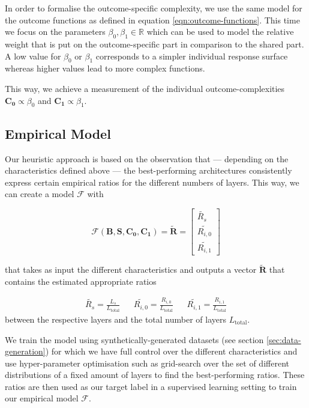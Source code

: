 In order to formalise the outcome-specific complexity, we use the same model for the outcome functions as defined in equation \ref{eqn:outcome-functions}. This time we focus on the parameters $\beta_0, \beta_1 \in \mathbb{R}$ which can be used to model the relative weight that is put on the outcome-specific part in comparison to the shared part. A low value for $\beta_0$ or $\beta_1$ corresponds to a simpler individual response surface whereas higher values lead to more complex functions.  

This way, we achieve a measurement of the individual outcome-complexities $\mathbf{C_0} \propto \beta_0$ and $\mathbf{C_1} \propto \beta_1$.

\subsection{Empirical Model} \label{sec:empirical-model}
Our heuristic approach is based on the observation that --- depending on the characteristics defined above --- the best-performing architectures consistently express certain empirical ratios for the different numbers of layers. This way, we can create a model $\mathcal{F}$ with 

\begin{equation}
\mathcal{F}(\mathbf{B}, \mathbf{S}, \mathbf{C_0}, \mathbf{C_1}) = \tilde{\mathbf{R}} = \begin{bmatrix}
\tilde{R_{s}} \\
\tilde{R_{i,0}} \\
\tilde{R_{i,1}}
\end{bmatrix} 
\end{equation}

that takes as input the different characteristics and outputs a vector $\tilde{\mathbf{R}}$ that contains the estimated appropriate ratios 

\begin{align} 
\tilde{R_{s}} = \frac{L_{s}}{L_{\text{total}}} && \tilde{R_{i,0}} = \frac{R_{i,0}}{L_{\text{total}}} && \tilde{R_{i,1}} =\frac{R_{i,1}}{L_{\text{total}}}
\end{align} 
between the respective layers and the total number of layers $L_{\text{total}}$. 

We train the model using  synthetically-generated datasets (see section \ref{sec:data-generation}) for which we have full control over the different characteristics and use hyper-parameter optimisation such as grid-search over the set of different distributions of a fixed amount of layers to find the best-performing ratios. These ratios are then used as our target label in a supervised learning setting to train our empirical model $\mathcal{F}$. 



